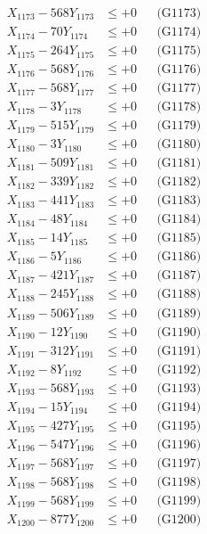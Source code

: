 \documentclass[a4paper,10pt]{article}
\begin{document}
{\begin{align}
X_{1173} - 568Y_{1173} &\leq +0 && \text{(G1173)} \\
X_{1174} - 70Y_{1174} &\leq +0 && \text{(G1174)} \\
X_{1175} - 264Y_{1175} &\leq +0 && \text{(G1175)} \\
X_{1176} - 568Y_{1176} &\leq +0 && \text{(G1176)} \\
X_{1177} - 568Y_{1177} &\leq +0 && \text{(G1177)} \\
X_{1178} - 3Y_{1178} &\leq +0 && \text{(G1178)} \\
X_{1179} - 515Y_{1179} &\leq +0 && \text{(G1179)} \\
X_{1180} - 3Y_{1180} &\leq +0 && \text{(G1180)} \\
\allowbreak
X_{1181} - 509Y_{1181} &\leq +0 && \text{(G1181)} \\
X_{1182} - 339Y_{1182} &\leq +0 && \text{(G1182)} \\
X_{1183} - 441Y_{1183} &\leq +0 && \text{(G1183)} \\
X_{1184} - 48Y_{1184} &\leq +0 && \text{(G1184)} \\
X_{1185} - 14Y_{1185} &\leq +0 && \text{(G1185)} \\
X_{1186} - 5Y_{1186} &\leq +0 && \text{(G1186)} \\
X_{1187} - 421Y_{1187} &\leq +0 && \text{(G1187)} \\
X_{1188} - 245Y_{1188} &\leq +0 && \text{(G1188)} \\
X_{1189} - 506Y_{1189} &\leq +0 && \text{(G1189)} \\
X_{1190} - 12Y_{1190} &\leq +0 && \text{(G1190)} \\
\allowbreak
X_{1191} - 312Y_{1191} &\leq +0 && \text{(G1191)} \\
X_{1192} - 8Y_{1192} &\leq +0 && \text{(G1192)} \\
X_{1193} - 568Y_{1193} &\leq +0 && \text{(G1193)} \\
X_{1194} - 15Y_{1194} &\leq +0 && \text{(G1194)} \\
X_{1195} - 427Y_{1195} &\leq +0 && \text{(G1195)} \\
X_{1196} - 547Y_{1196} &\leq +0 && \text{(G1196)} \\
X_{1197} - 568Y_{1197} &\leq +0 && \text{(G1197)} \\
X_{1198} - 568Y_{1198} &\leq +0 && \text{(G1198)} \\
X_{1199} - 568Y_{1199} &\leq +0 && \text{(G1199)} \\
X_{1200} - 877Y_{1200} &\leq +0 && \text{(G1200)} \\

\end{align}}
\end{document}
